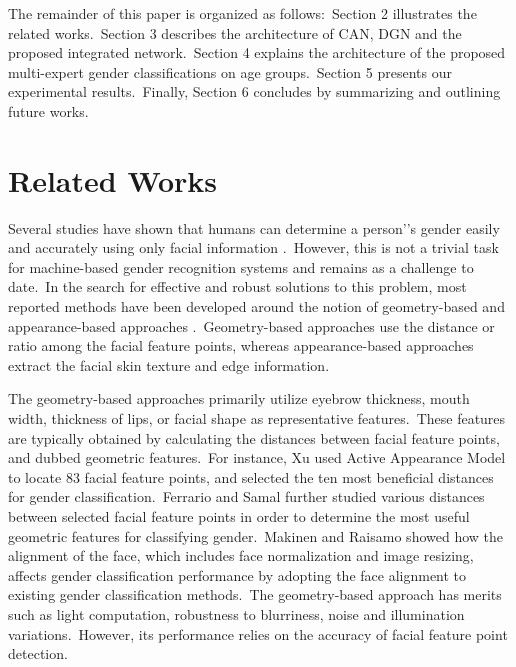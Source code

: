 \documentclass[10pt,twocolumn,letterpaper]{article}
\begin{document}
The remainder of this paper is organized as follows:~Section 2 illustrates the related works.~Section 3 describes the architecture of CAN, DGN and the proposed integrated network.~Section 4 explains the architecture of the proposed multi-expert gender classifications on age groups.~Section 5 presents our experimental results.~Finally, Section 6 concludes by summarizing and outlining future works.

\section{Related Works}
\label{Related Works}

Several studies have shown that humans can determine a person'’s gender easily and accurately using only facial information \cite{Brown1993, Burton1993}.~However, this is not a trivial task for machine-based gender recognition systems and remains as a challenge to date.~In the search for effective and robust solutions to this problem, most reported methods have been developed around the notion of geometry-based and appearance-based approaches \cite{Shih2013}.~Geometry-based approaches use the distance or ratio among the facial feature points, whereas appearance-based approaches extract the facial skin texture and edge information.

The geometry-based approaches primarily utilize eyebrow thickness, mouth width, thickness of lips, or facial shape as representative features.~These features are typically obtained by calculating the distances between facial feature points, and dubbed geometric features.~For instance, Xu \etal \cite{Xu2008} used Active Appearance Model to locate 83 facial feature points, and selected the ten most beneficial distances for gender classification.~Ferrario \etal \cite{Ferrario1993} and Samal \etal \cite{Samal2007} further studied various distances between selected facial feature points in order to determine the most useful geometric features for classifying gender.~Makinen and Raisamo \cite{Makinen2008} showed how the alignment of the face, which includes face normalization and image resizing, affects gender classification performance by adopting the face alignment to existing gender classification methods.~The geometry-based approach has merits such as light computation, robustness to blurriness, noise and illumination variations.~However, its performance relies on the accuracy of facial feature point detection.
\end{document}
